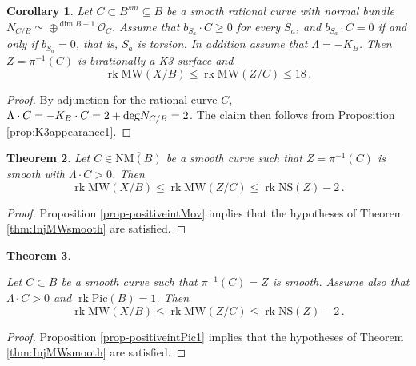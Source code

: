 \documentclass[11pt]{amsart}
\newtheorem{theorem}{Theorem}[section]
\newtheorem{corollary}[theorem]{Corollary}
\theoremstyle{definition}
\theoremstyle{definition}
\theoremstyle{remark}
\theoremstyle{remark}
\theoremstyle{definition}
\theoremstyle{conjecture}
\newcommand{\NS}{\mathrm{NS}}
\newcommand{\MW}{\mathrm{MW}}
\newcommand{\Pic}{\mathrm{Pic}}
\begin{document}
\begin{corollary}\label{cor:MWForZK3}
 Let $C \subset B^{sm} \subseteq  B $ be a smooth rational curve
 with normal bundle $ N_{C/B} \simeq \oplus ^{\dim B -1}\mathcal{O}_C$. 
  Assume that
$b_{S_a} \cdot C \geq 0$ for every $S_a$, and
$b_{S_a} \cdot C = 0$ if and only if $b_{S_a}=0$, that is, $S_a$ is torsion. 
In addition assume that $\Lambda = - K_B$. 
Then $Z=\pi^{-1}(C)$ is birationally a K3 surface and
   \begin{equation} 
    \operatorname{rk} \MW(X/B) \leq \operatorname{rk} \MW(Z/C)   \leq 18 \,.
\end{equation}  \end{corollary}
\begin{proof}
By adjunction for the rational curve $C$,
$\Lambda \cdot C = -K_B \cdot C = 2 + {\rm deg}N_{C/B} = 2$. The claim then follows from Proposition \ref{prop:K3appearance1}.
\end{proof}







\begin{theorem}\label{thm:MWNSMov}
 Let $C\in \overline{\mathrm{NM}(B)}$ be  a smooth curve    such that   $Z = \pi^{-1}(C) $ is smooth 
 with $\Lambda \cdot C > 0$.
 Then
\[ 
\operatorname{rk} \MW(X/B) \leq \operatorname{rk} \MW(Z/C)   \leq \operatorname{rk} \NS(Z) - 2  \,.
\]
\end{theorem}




\begin{proof}  Proposition \ref{prop-positiveintMov} implies that the hypotheses of Theorem \ref{thm:InjMWsmooth} are satisfied. \end{proof}

\begin{theorem}\label{thm:MWNSPic1} 

Let  $C \subset B$  be a smooth 
curve such that $\pi^{-1}(C)=Z$ is smooth.
 Assume also that $\Lambda \cdot C > 0$ and $\operatorname{rk} \Pic (B)=1$.  Then 
\[ 
\operatorname{rk} \MW(X/B) \leq \operatorname{rk} \MW(Z/C)   \leq \operatorname{rk} \NS(Z) - 2  \,.
\]
\end{theorem}

\begin{proof}    Proposition \ref{prop-positiveintPic1}
 implies that the hypotheses of Theorem \ref{thm:InjMWsmooth} are satisfied.\end{proof}
  
\end{document}

